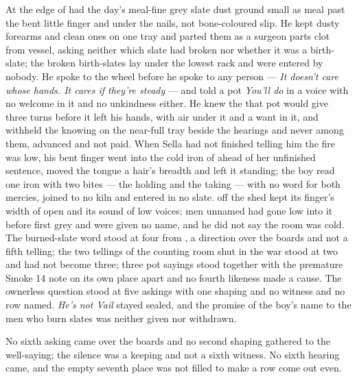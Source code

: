 At the edge of   had the day's meal-fine grey slate dust ground small as meal past the bent little finger and under the nails, not bone-coloured slip. He kept dusty forearms and clean ones on one tray and parted them as a surgeon parts clot from vessel, asking neither which slate had broken nor whether it was a birth-slate; the broken birth-slates lay under the lowest rack and were entered by nobody. He spoke to the wheel before he spoke to any person --- \emph{It doesn't care whose hands. It cares if they're steady} --- and told a pot \emph{You'll do} in a voice with no welcome in it and no unkindness either. He knew the  that pot would give three turns before it left his hands, with air under it and a want in it, and withheld the knowing on the near-full tray beside the hearings and never among them, advanced and not paid. When Sella had not finished telling him the fire was low, his bent finger went into the cold iron of  ahead of her unfinished sentence, moved the tongue a hair's breadth and left it standing; the boy read one iron with two bites --- the holding and the taking --- with no  word for both mercies, joined to no kiln and entered in no slate.  off the shed kept its finger's width of open and its sound of low voices; men unnamed had gone low into it before first grey and were given no name, and he did not say the room was cold. The burned-slate word stood at four from , a direction over the boards and not a fifth telling; the two tellings of the counting room shut in the war stood at two and had not become three; three pot sayings stood together with the premature Smoke 14 note on its own place apart and no fourth likeness made a cause. The ownerless question stood at five askings with one shaping and no witness and no row named. \emph{He's not Vail} stayed sealed, and the promise of the boy's name to the men who burn slates was neither given nor withdrawn.

No sixth asking came over the boards and no second shaping gathered to the well-saying; the silence was a keeping and not a sixth witness. No sixth hearing came, and the empty seventh place was not filled to make a row come out even.

